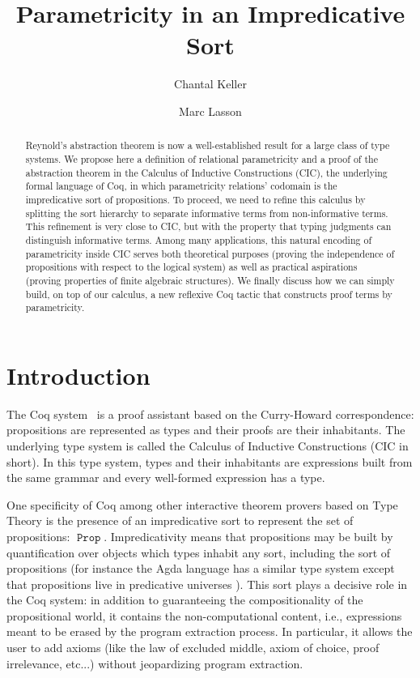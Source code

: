 \documentclass[a4paper,USenglish]{lipics}
\title{Parametricity in an Impredicative Sort}
\author[1]{Chantal Keller}
\author[2]{Marc Lasson}
\affil[1]{INRIA Saclay--Île-de-France at École Polytechnique\\
  \texttt{Chantal.Keller@inria.fr}}
\affil[2]{École Normale Supérieure de Lyon, Université de Lyon, LIP
\footnote{UMR 5668 CNRS ENS Lyon UCBL INRIA}
\\\texttt{marc.lasson@ens-lyon.org}}
\DeclareMathOperator{\Prop}{\mathtt{Prop}}
\def\coq{\textsf{Coq}\xspace}
\def\cic{\textsf{CIC}\xspace}
\def\agda{\textsf{Agda}\xspace}
\begin{document}
\lstset{breaklines=true, xleftmargin=0.3cm, xrightmargin=0.3cm,
  breakatwhitespace=true, mathescape=true, basicstyle=\ttfamily,
  numbers=none, frame=none, language = Coq}

\maketitle

\begin{abstract}
  Reynold's abstraction theorem is now a well-established result for a
  large class of type systems. We propose here a definition of
  relational parametricity and a proof of the abstraction theorem in the
  Calculus of Inductive Constructions (\cic), the underlying formal language of
  \coq, in which parametricity relations' codomain is the impredicative
  sort of propositions. To proceed, we need to refine this calculus by
  splitting the sort hierarchy to separate informative terms from
  non-informative terms. This refinement is very close to \cic, but with
  the property that typing judgments can distinguish informative terms.
  Among many applications, this natural encoding of parametricity inside
  \cic serves both theoretical purposes (proving the independence of
  propositions with respect to the logical system) as well as practical
  aspirations (proving properties of finite algebraic structures). We
  finally discuss how we can simply build, on top of our calculus, a new
  reflexive \coq tactic that constructs proof terms by parametricity.
\end{abstract}

\EnableBpAbbreviations

\section{Introduction}

The \coq system~\cite{Coqdev11} is a proof assistant based on the
Curry-Howard correspondence: propositions are represented as types and
their proofs are their inhabitants. The underlying type system is called
the Calculus of Inductive Constructions (\cic in short). In this type
system, types and their inhabitants are expressions built from the same
grammar and every well-formed expression has a type.

One specificity of \coq among other interactive theorem provers based on Type
Theory is the presence of an impredicative sort to represent the set of
propositions: $\Prop$. Impredicativity means that propositions may be built
by quantification over objects which types inhabit any sort, including the
sort of propositions (for instance the \agda language has a similar type
system except that propositions live in predicative universes
\cite{norell07}). This sort plays a decisive role in the \coq system: in
addition to guaranteeing the compositionality of the propositional world, it
contains the non-computational content, i.e., expressions meant to be erased
by the program extraction process. In particular, it allows the user to add
axioms (like the law of excluded middle, axiom of choice, proof irrelevance,
etc...) without jeopardizing program extraction.
\end{document}
